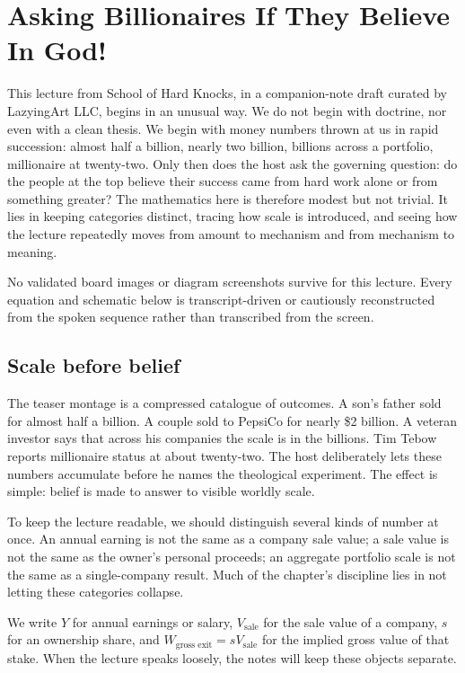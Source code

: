 \chapter{Asking Billionaires If They Believe In God!}

This lecture from School of Hard Knocks, in a companion-note draft curated by LazyingArt LLC, begins in an unusual way. We do not begin with doctrine, nor even with a clean thesis. We begin with money numbers thrown at us in rapid succession: almost half a billion, nearly two billion, billions across a portfolio, millionaire at twenty-two. Only then does the host ask the governing question: do the people at the top believe their success came from hard work alone or from something greater? The mathematics here is therefore modest but not trivial. It lies in keeping categories distinct, tracing how scale is introduced, and seeing how the lecture repeatedly moves from amount to mechanism and from mechanism to meaning.

\begin{remark}
No validated board images or diagram screenshots survive for this lecture. Every equation and schematic below is transcript-driven or cautiously reconstructed from the spoken sequence rather than transcribed from the screen.
\end{remark}

\section{Scale before belief}

The teaser montage is a compressed catalogue of outcomes. A son's father sold for almost half a billion. A couple sold to PepsiCo for nearly \$2 billion. A veteran investor says that across his companies the scale is in the billions. Tim Tebow reports millionaire status at about twenty-two. The host deliberately lets these numbers accumulate before he names the theological experiment. The effect is simple: belief is made to answer to visible worldly scale.

To keep the lecture readable, we should distinguish several kinds of number at once. An annual earning is not the same as a company sale value; a sale value is not the same as the owner's personal proceeds; an aggregate portfolio scale is not the same as a single-company result. Much of the chapter's discipline lies in not letting these categories collapse.

\begin{definition}
We write \(Y\) for annual earnings or salary, \(V_{\text{sale}}\) for the sale value of a company, \(s\) for an ownership share, and \(W_{\text{gross exit}}=sV_{\text{sale}}\) for the implied gross value of that stake. When the lecture speaks loosely, the notes will keep these objects separate.
\end{definition}

